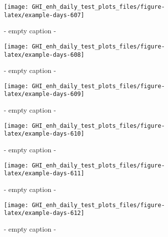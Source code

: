 \documentclass[
  10pt,
  a4paper,oneside]{article}
\begin{document}
\begin{figure}[H]

{\centering \texttt{[image: GHI\_enh\_daily\_test\_plots\_files/figure-latex/example-days-607]} 

}

\caption{ - empty caption - }\label{fig:example-days-607}
\end{figure}

\begin{figure}[H]

{\centering \texttt{[image: GHI\_enh\_daily\_test\_plots\_files/figure-latex/example-days-608]} 

}

\caption{ - empty caption - }\label{fig:example-days-608}
\end{figure}

\begin{figure}[H]

{\centering \texttt{[image: GHI\_enh\_daily\_test\_plots\_files/figure-latex/example-days-609]} 

}

\caption{ - empty caption - }\label{fig:example-days-609}
\end{figure}

\begin{figure}[H]

{\centering \texttt{[image: GHI\_enh\_daily\_test\_plots\_files/figure-latex/example-days-610]} 

}

\caption{ - empty caption - }\label{fig:example-days-610}
\end{figure}

\begin{figure}[H]

{\centering \texttt{[image: GHI\_enh\_daily\_test\_plots\_files/figure-latex/example-days-611]} 

}

\caption{ - empty caption - }\label{fig:example-days-611}
\end{figure}

\begin{figure}[H]

{\centering \texttt{[image: GHI\_enh\_daily\_test\_plots\_files/figure-latex/example-days-612]} 

}

\caption{ - empty caption - }\label{fig:example-days-612}
\end{figure}
\end{document}

